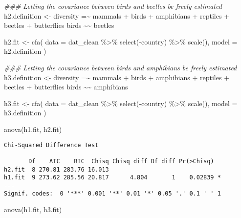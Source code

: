 \documentclass[
  letterpaper,
  DIV=11,
  numbers=noendperiod]{scrreprt}
\newenvironment{Shaded}{\begin{snugshade}}{\end{snugshade}}
\newcommand{\AttributeTok}[1]{\textcolor[rgb]{0.40,0.45,0.13}{#1}}
\newcommand{\DocumentationTok}[1]{\textcolor[rgb]{0.37,0.37,0.37}{\textit{#1}}}
\newcommand{\FunctionTok}[1]{\textcolor[rgb]{0.28,0.35,0.67}{#1}}
\newcommand{\NormalTok}[1]{\textcolor[rgb]{0.00,0.23,0.31}{#1}}
\newcommand{\OtherTok}[1]{\textcolor[rgb]{0.00,0.23,0.31}{#1}}
\newcommand{\SpecialCharTok}[1]{\textcolor[rgb]{0.37,0.37,0.37}{#1}}
\newcommand{\StringTok}[1]{\textcolor[rgb]{0.13,0.47,0.30}{#1}}
\begin{document}
\begin{Shaded}
\begin{Highlighting}[]
\DocumentationTok{\#\#\# Letting the covariance between birds and beetles be freely estimated}
\NormalTok{h2.definition }\OtherTok{\textless{}{-}} 
\StringTok{\textquotesingle{}diversity =\textasciitilde{} mammals + birds + amphibians + }
\StringTok{              reptiles + beetles + butterflies}
\StringTok{ }
\StringTok{ birds \textasciitilde{}\textasciitilde{} beetles\textquotesingle{}}


\NormalTok{h2.fit }\OtherTok{\textless{}{-}} \FunctionTok{cfa}\NormalTok{(}
  \AttributeTok{data  =}\NormalTok{ dat\_clean }\SpecialCharTok{\%\textgreater{}\%} \FunctionTok{select}\NormalTok{(}\SpecialCharTok{{-}}\NormalTok{country) }\SpecialCharTok{\%\textgreater{}\%} \FunctionTok{scale}\NormalTok{(),}
  \AttributeTok{model =}\NormalTok{ h2.definition}
\NormalTok{)}

\DocumentationTok{\#\#\# Letting the covariance between birds and amphibians be freely estimated}
\NormalTok{h3.definition }\OtherTok{\textless{}{-}} 
  \StringTok{\textquotesingle{}diversity =\textasciitilde{} mammals + birds + amphibians + }
\StringTok{              reptiles + beetles + butterflies}
\StringTok{ }
\StringTok{ birds \textasciitilde{}\textasciitilde{} amphibians\textquotesingle{}}


\NormalTok{h3.fit }\OtherTok{\textless{}{-}} \FunctionTok{cfa}\NormalTok{(}
 \AttributeTok{data  =}\NormalTok{ dat\_clean }\SpecialCharTok{\%\textgreater{}\%} \FunctionTok{select}\NormalTok{(}\SpecialCharTok{{-}}\NormalTok{country) }\SpecialCharTok{\%\textgreater{}\%} \FunctionTok{scale}\NormalTok{(),}
  \AttributeTok{model =}\NormalTok{ h3.definition}
\NormalTok{)}

\FunctionTok{anova}\NormalTok{(h1.fit, h2.fit)}
\end{Highlighting}
\end{Shaded}

\begin{verbatim}
Chi-Squared Difference Test

       Df    AIC    BIC  Chisq Chisq diff Df diff Pr(>Chisq)  
h2.fit  8 270.81 283.76 16.013                                
h1.fit  9 273.62 285.56 20.817      4.804       1    0.02839 *
---
Signif. codes:  0 '***' 0.001 '**' 0.01 '*' 0.05 '.' 0.1 ' ' 1
\end{verbatim}

\begin{Shaded}
\begin{Highlighting}[]
\FunctionTok{anova}\NormalTok{(h1.fit, h3.fit)}
\end{Highlighting}
\end{Shaded}
\end{document}
